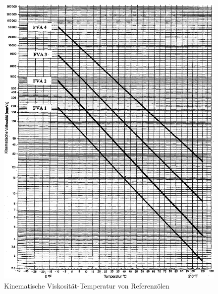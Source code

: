 \begin{appendices}
        \begin{figure}
            \centering
            \includegraphics[width=\linewidth]{./images/fva_kin_viskositaet_temperatur.png}
            \caption{Kinematische Viskosität-Temperatur von Referenzölen \cite{schilling_1985}}
            \label{fig:fva_kin_viskositaet_temperatur}
        \end{figure}


\end{appendices}
